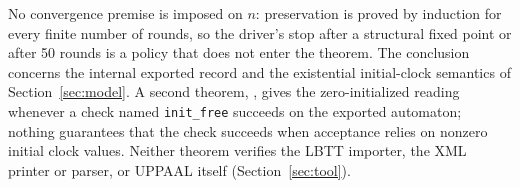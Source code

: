 No convergence premise is imposed on $n$: preservation is proved by induction for every finite number of rounds, so the driver's stop after a structural fixed point or after 50 rounds is a policy that does not enter the theorem. The conclusion concerns the internal exported record and the existential initial-clock semantics of Section~\ref{sec:model}. A second theorem, , gives the zero-initialized reading whenever a check named \texttt{init\_free} succeeds on the exported automaton; nothing guarantees that the check succeeds when acceptance relies on nonzero initial clock values. Neither theorem verifies the LBTT importer, the XML printer or parser, or UPPAAL itself (Section~\ref{sec:tool}).
